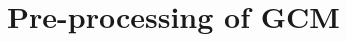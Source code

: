 \documentclass[a4paper,11pt,oneside]{report}
\begin{document}
\section{Pre-processing of GCM}


%
\end{document}
